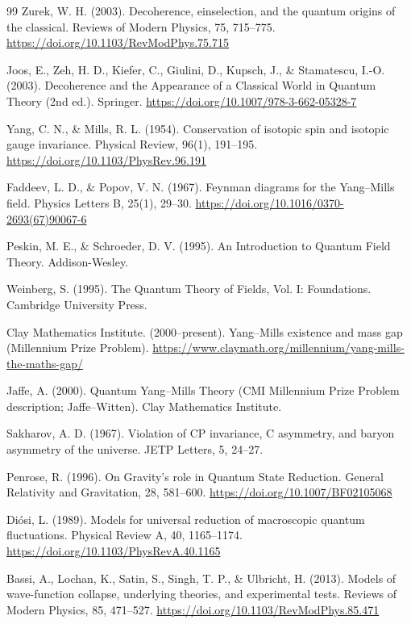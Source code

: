 \begin{thebibliography}{99}
		Zurek, W. H. (2003). Decoherence, einselection, and the quantum origins of the classical. Reviews of Modern Physics, 75, 715–775. \url{https://doi.org/10.1103/RevModPhys.75.715}
		
		Joos, E., Zeh, H. D., Kiefer, C., Giulini, D., Kupsch, J., \& Stamatescu, I.-O. (2003). Decoherence and the Appearance of a Classical World in Quantum Theory (2nd ed.). Springer. \url{https://doi.org/10.1007/978-3-662-05328-7}
		
		Yang, C. N., \& Mills, R. L. (1954). Conservation of isotopic spin and isotopic gauge invariance. Physical Review, 96(1), 191–195. \url{https://doi.org/10.1103/PhysRev.96.191}
		
		Faddeev, L. D., \& Popov, V. N. (1967). Feynman diagrams for the Yang–Mills field. Physics Letters B, 25(1), 29–30. \url{https://doi.org/10.1016/0370-2693(67)90067-6}
		
		Peskin, M. E., \& Schroeder, D. V. (1995). An Introduction to Quantum Field Theory. Addison-Wesley.
		
		Weinberg, S. (1995). The Quantum Theory of Fields, Vol. I: Foundations. Cambridge University Press.
		
		Clay Mathematics Institute. (2000–present). Yang–Mills existence and mass gap (Millennium Prize Problem). \url{https://www.claymath.org/millennium/yang-mills-the-maths-gap/}
		
		Jaffe, A. (2000). Quantum Yang–Mills Theory (CMI Millennium Prize Problem description; Jaffe–Witten). Clay Mathematics Institute.
		
		Sakharov, A. D. (1967). Violation of CP invariance, C asymmetry, and baryon asymmetry of the universe. JETP Letters, 5, 24–27.
		
		Penrose, R. (1996). On Gravity’s role in Quantum State Reduction. General Relativity and Gravitation, 28, 581–600. \url{https://doi.org/10.1007/BF02105068}
		
		Diósi, L. (1989). Models for universal reduction of macroscopic quantum fluctuations. Physical Review A, 40, 1165–1174. \url{https://doi.org/10.1103/PhysRevA.40.1165}
		
		Bassi, A., Lochan, K., Satin, S., Singh, T. P., \& Ulbricht, H. (2013). Models of wave-function collapse, underlying theories, and experimental tests. Reviews of Modern Physics, 85, 471–527. \url{https://doi.org/10.1103/RevModPhys.85.471}
		

\end{thebibliography}
